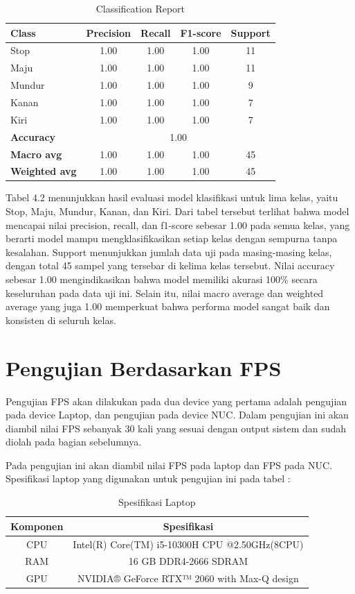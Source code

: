 \begin{table}[h!]
\centering
\caption{Classification Report}
\begin{tabular}{lcccc}
\hline
\textbf{Class} & \textbf{Precision} & \textbf{Recall} & \textbf{F1-score} & \textbf{Support} \\
\hline
Stop   & 1.00 & 1.00 & 1.00 & 11 \\
Maju   & 1.00 & 1.00 & 1.00 & 11 \\
Mundur & 1.00 & 1.00 & 1.00 & 9  \\
Kanan  & 1.00 & 1.00 & 1.00 & 7  \\
Kiri   & 1.00 & 1.00 & 1.00 & 7  \\
\hline
\textbf{Accuracy}     & \multicolumn{4}{c}{1.00} \\
\textbf{Macro avg}    & 1.00 & 1.00 & 1.00 & 45 \\
\textbf{Weighted avg} & 1.00 & 1.00 & 1.00 & 45 \\
\hline
\end{tabular}
\end{table}

Tabel 4.2 menunjukkan hasil evaluasi model klasifikasi untuk lima kelas, yaitu Stop, Maju, Mundur, Kanan, dan Kiri. Dari tabel tersebut terlihat bahwa model mencapai nilai precision, recall, dan f1-score sebesar 1.00 pada semua kelas, 
yang berarti model mampu mengklasifikasikan setiap kelas dengan sempurna tanpa kesalahan. Support menunjukkan jumlah data uji pada masing-masing kelas, dengan total 45 sampel yang tersebar di kelima kelas tersebut. Nilai accuracy sebesar 1.00 
mengindikasikan bahwa model memiliki akurasi 100\% secara keseluruhan pada data uji ini. Selain itu, nilai macro average dan weighted average yang juga 1.00 memperkuat bahwa performa model sangat baik dan konsisten di seluruh kelas.

\section{Pengujian Berdasarkan FPS}
Pengujian FPS akan dilakukan pada dua device yang pertama adalah pengujian pada device Laptop, dan pengujian pada device NUC. Dalam pengujian ini akan diambil nilai FPS sebanyak 30 kali yang sesuai dengan output sistem dan sudah diolah pada bagian sebelumnya.

Pada pengujian ini akan diambil nilai FPS pada laptop dan FPS pada NUC. Spesifikasi laptop yang digunakan untuk pengujian ini pada tabel  :

\begin{longtable}{|c|c|}
  \caption{Spesifikasi Laptop}
  \label{tb:Spesifikasi Laptop}                                   \\
  \hline
  \rowcolor[HTML]{C0C0C0}
  \textbf{Komponen} & \textbf{Spesifikasi}  \\
  \hline
  CPU            & Intel(R) Core(TM) i5-10300H CPU @2.50GHz(8CPU)        \\ \hline
  RAM            & 16 GB DDR4-2666 SDRAM        \\ \hline
  GPU            & NVIDIA® GeForce RTX™ 2060 with Max-Q design           \\ \hline
  \hline
\end{longtable}

